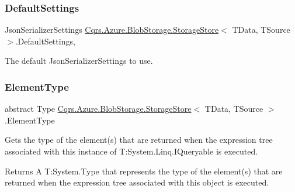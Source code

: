 \subsubsection{\texorpdfstring{Default\+Settings}{DefaultSettings}}
{\footnotesize\ttfamily Json\+Serializer\+Settings \hyperlink{classCqrs_1_1Azure_1_1BlobStorage_1_1StorageStore}{Cqrs.\+Azure.\+Blob\+Storage.\+Storage\+Store}$<$ T\+Data, T\+Source $>$.Default\+Settings\hspace{0.3cm}{\ttfamily [static]}, {\ttfamily [get]}}



The default Json\+Serializer\+Settings to use. 

\mbox{\label{classCqrs_1_1Azure_1_1BlobStorage_1_1StorageStore_af298920154f31a7d0117facbb2f7cd54_af298920154f31a7d0117facbb2f7cd54}} 
\subsubsection{\texorpdfstring{Element\+Type}{ElementType}}
{\footnotesize\ttfamily abstract Type \hyperlink{classCqrs_1_1Azure_1_1BlobStorage_1_1StorageStore}{Cqrs.\+Azure.\+Blob\+Storage.\+Storage\+Store}$<$ T\+Data, T\+Source $>$.Element\+Type\hspace{0.3cm}{\ttfamily [get]}}



Gets the type of the element(s) that are returned when the expression tree associated with this instance of T\+:\+System.\+Linq.\+I\+Queryable is executed. 

\begin{DoxyReturn}{Returns}
A T\+:\+System.\+Type that represents the type of the element(s) that are returned when the expression tree associated with this object is executed. 
\end{DoxyReturn}
\mbox{\label{classCqrs_1_1Azure_1_1BlobStorage_1_1StorageStore_a21c204b514718b8af550ce2a627c4b70_a21c204b514718b8af550ce2a627c4b70}} 
